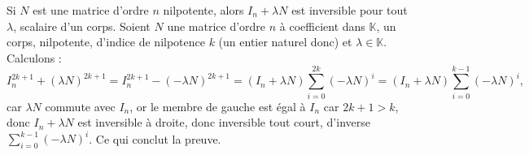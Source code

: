 \documentclass{article}
\renewenvironment{question_kholle}[2][ ]
{
	\subsection{\texorpdfstring{#2}{}}
	\notblank{#1}
	{
		\noindent #1
		\bigbreak
	}
	{}
	\begin{proof}
}
{
	\end{proof}
}
\begin{document}
\begin{question_kholle}
  {Si $N$ est une matrice d'ordre $n$ nilpotente, alors $I_n + \lambda N$ est inversible pour tout $\lambda$, scalaire d'un corps.}
  Soient $N$ une matrice d'ordre $n$ à coefficient dans $\mathbb{K}$, un corps, nilpotente, d'indice de nilpotence $k$ (un entier naturel donc) et $\lambda \in \mathbb{K}$. Calculons :
  \[
    I_n^{2k+1} + (\lambda N)^{2k+1} = I_n^{2k+1} - (- \lambda N)^{2k+1} = (I_n + \lambda N)\sum_{i=0}^{2k}(-\lambda N)^i =  (I_n + \lambda N)\sum_{i=0}^{k-1}(-\lambda N)^i,
  \]
  car $\lambda N$ commute avec $I_n$, or le membre de gauche est égal à $I_n$ car $2k+1 > k$, donc $I_n + \lambda N$ est inversible à droite, donc inversible tout court, d'inverse $\sum_{i=0}^{k-1}(-\lambda N)^i$. Ce qui conclut la preuve.
\end{question_kholle}
\end{document}
